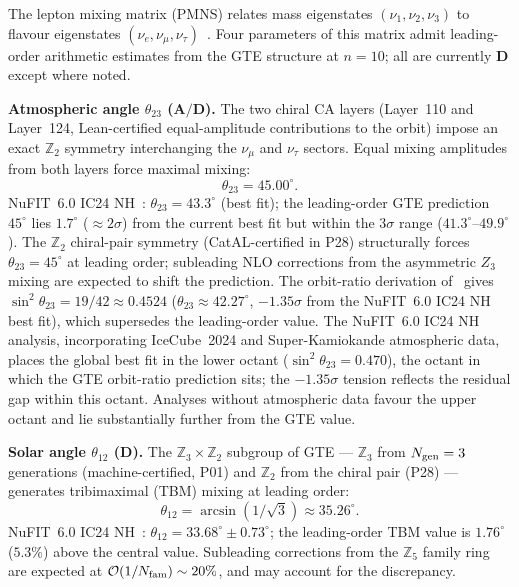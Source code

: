 \documentclass[11pt]{article}
\theoremstyle{remark}
\newcommand{\Ngen}{N_{\rm gen}}
\newcommand{\Nfam}{N_{\rm fam}}
\newcommand{\CatAD}{\textbf{A/D}}
\newcommand{\CatD}{\textbf{D}}
\begin{document}
The lepton mixing matrix (PMNS) relates mass eigenstates $(\nu_1,\nu_2,\nu_3)$
to flavour eigenstates $(\nu_e,\nu_\mu,\nu_\tau)$~\cite{PDG2022}.
Four parameters of this matrix admit leading-order arithmetic estimates from
the GTE structure at $n=10$; all are currently $\CatD$ except where noted.

\textbf{Atmospheric angle $\theta_{23}$ ($\CatAD$).}\;
The two chiral CA layers (Layer~110 and Layer~124, Lean-certified equal-amplitude
contributions to the orbit) impose an exact $\mathbb{Z}_2$ symmetry interchanging
the $\nu_\mu$ and $\nu_\tau$ sectors.
Equal mixing amplitudes from both layers force maximal mixing:
\begin{equation}
  \theta_{23} = 45.00^{\circ}.
  \label{eq:theta23}
\end{equation}
NuFIT~6.0 IC24 NH~\cite{NuFIT60}: $\theta_{23} = 43.3^\circ$ (best fit);
the leading-order GTE prediction $45^\circ$ lies $1.7^\circ$ ($\approx 2\sigma$)
from the current best fit but within the $3\sigma$ range ($41.3^\circ$--$49.9^\circ$).
The $\mathbb{Z}_2$ chiral-pair symmetry (CatAL-certified in P28) structurally
forces $\theta_{23} = 45^{\circ}$ at leading order; subleading NLO corrections
from the asymmetric $Z_3$ mixing are expected to shift the prediction.
The orbit-ratio derivation of~\cite{SpivackNeutrino,SpivackGTEUnification} gives
$\sin^2\theta_{23} = 19/42 \approx 0.4524$ ($\theta_{23} \approx 42.27^\circ$,
$-1.35\sigma$ from the NuFIT~6.0 IC24 NH best fit), which supersedes the leading-order value.
The NuFIT~6.0 IC24 NH analysis, incorporating IceCube~2024 and Super-Kamiokande
atmospheric data, places the global best fit in the lower octant
($\sin^2\theta_{23} = 0.470$), the octant in which the GTE orbit-ratio prediction
sits; the $-1.35\sigma$ tension reflects the residual gap within this octant.
Analyses without atmospheric data favour the upper octant and lie substantially
further from the GTE value.

\textbf{Solar angle $\theta_{12}$ ($\CatD$).}\;
The $\mathbb{Z}_3 \times \mathbb{Z}_2$ subgroup of GTE --- $\mathbb{Z}_3$ from
$\Ngen = 3$ generations (machine-certified, P01) and $\mathbb{Z}_2$ from the
chiral pair (P28) --- generates tribimaximal (TBM) mixing at leading order:
\begin{equation}
  \theta_{12} = \arcsin(1/\!\sqrt{3}) \approx 35.26^{\circ}.
  \label{eq:theta12}
\end{equation}
NuFIT~6.0 IC24 NH~\cite{NuFIT60}: $\theta_{12} = 33.68^{\circ} \pm 0.73^{\circ}$; the
leading-order TBM value is $1.76^{\circ}$ ($5.3\%$) above the central value.
Subleading corrections from the $\mathbb{Z}_5$ family ring are expected at
$\mathcal{O}(1/\Nfam) \sim 20\%$, and may account for the discrepancy.
\end{document}
